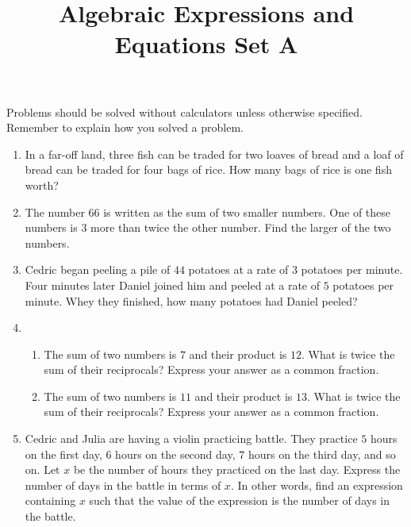 \documentclass{article}
\title{Algebraic Expressions and Equations Set A}
\author{}
\date{}
\begin{document}
    \maketitle
    \noindent Problems should be solved without calculators unless otherwise specified. Remember to explain how you solved a problem.
    \begin{enumerate}
        \item In a far-off land, three fish can be traded for two loaves of bread and a loaf of bread can be traded for four bags of rice. How many bags of rice is one fish worth?
        \vspace{3cm}
        \item The number $66$ is written as the sum of two smaller numbers. One of these numbers is $3$ more than twice the other number. Find the larger of the two numbers.
        \vspace{3cm}
        \item Cedric began peeling a pile of $44$ potatoes at a rate of $3$ potatoes per minute. Four minutes later Daniel joined him and peeled at a rate of $5$ potatoes per minute. Whey they finished, how many potatoes had Daniel peeled?
        \vspace{3cm}
        \item \begin{enumerate}
            \item The sum of two numbers is $7$ and their product is $12$. What is twice the sum of their reciprocals? Express your answer as a common fraction.
            \vspace{3cm}
            \item The sum of two numbers is $11$ and their product is $13$. What is twice the sum of their reciprocals? Express your answer as a common fraction.
            \vspace{3cm}
        \end{enumerate}
        \item Cedric and Julia are having a violin practicing battle. They practice $5$ hours on the first day, $6$ hours on the second day, $7$ hours on the third day, and so on. Let $x$ be the number of hours they practiced on the last day. Express the number of days in the battle in terms of $x$. In other words, find an expression containing $x$ such that the value of the expression is the number of days in the battle.
        \vspace{3cm}
    \end{enumerate}
\end{document}
